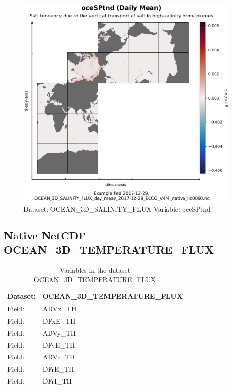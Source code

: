 \begin{figure}[H]
\centering
\includegraphics[scale=0.55]{../images/plots/native_plots/Ocean_Three-Dimensional_Salinity_Fluxes/oceSPtnd.png}
\caption{Dataset: OCEAN\_3D\_SALINITY\_FLUX Variable: oceSPtnd}
\label{tab:table-OCEAN_3D_SALINITY_FLUX_oceSPtnd-Plot}
\end{figure}
\pagebreak
\subsection{Native NetCDF OCEAN\_3D\_TEMPERATURE\_FLUX}
\newp
\begin{longtable}{|p{}|p{}|}
\caption{Variables in the dataset OCEAN\_3D\_TEMPERATURE\_FLUX}
\label{tab:table-OCEAN_3D_TEMPERATURE_FLUX-fields} \\ 
\hline \endhead \hline \endfoot
\rowcolor{lightgray} \textbf{Dataset:} & \textbf{OCEAN\_3D\_TEMPERATURE\_FLUX} \\ \hline
Field: &ADVx\_TH \\ \hline
Field: &DFxE\_TH \\ \hline
Field: &ADVy\_TH \\ \hline
Field: &DFyE\_TH \\ \hline
Field: &ADVr\_TH \\ \hline
Field: &DFrE\_TH \\ \hline
Field: &DFrI\_TH \\ \hline
\end{longtable}

